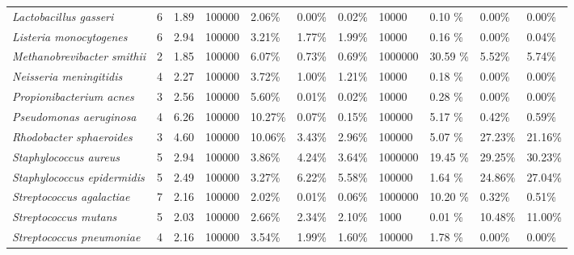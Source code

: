 \documentclass{article}
\begin{document}
\begin{landscape}
\begin{table}
\begin{tabular}{lllllllllll}
\textit{Lactobacillus gasseri} & 6 & 1.89  & 100000 & 2.06\% & 0.00\% &  0.02\% & 10000 & 0.10 \%   & 0.00\%  & 0.00\% \\
\textit{Listeria monocytogenes} & 6 & 2.94  & 100000 & 3.21\% & 1.77\% &  1.99\% & 10000 & 0.16 \%   & 0.00\%  & 0.04\% \\
\textit{Methanobrevibacter smithii} & 2 & 1.85  & 100000 & 6.07\% & 0.73\% &  0.69\% & 1000000 & 30.59 \%   & 5.52\%  & 5.74\% \\
\textit{Neisseria meningitidis} & 4 & 2.27  & 100000 & 3.72\% & 1.00\% &  1.21\% & 10000 & 0.18 \%   & 0.00\%  & 0.00\% \\
\textit{Propionibacterium acnes} & 3 & 2.56  & 100000 & 5.60\% & 0.01\% &  0.02\% & 10000 & 0.28 \%   & 0.00\%  & 0.00\% \\
\textit{Pseudomonas aeruginosa} & 4 & 6.26  & 100000 & 10.27\% & 0.07\% &  0.15\% & 100000 & 5.17 \%   & 0.42\%  & 0.59\% \\
\textit{Rhodobacter sphaeroides} & 3 & 4.60  & 100000 & 10.06\% & 3.43\% &  2.96\% & 100000 & 5.07 \%   & 27.23\%  & 21.16\% \\
\textit{Staphylococcus aureus} & 5 & 2.94  & 100000 & 3.86\% & 4.24\% &  3.64\% & 1000000 & 19.45 \%   & 29.25\%  & 30.23\% \\
\textit{Staphylococcus epidermidis} & 5 & 2.49  & 100000 & 3.27\% & 6.22\% &  5.58\% & 100000 & 1.64 \%   & 24.86\%  & 27.04\% \\
\textit{Streptococcus agalactiae} & 7 & 2.16  & 100000 & 2.02\% & 0.01\% &  0.06\% & 1000000 & 10.20 \%   & 0.32\%  & 0.51\% \\
\textit{Streptococcus mutans} & 5 & 2.03  & 100000 & 2.66\% & 2.34\% &  2.10\% & 1000 & 0.01 \%   & 10.48\%  & 11.00\% \\
\textit{Streptococcus pneumoniae} & 4 & 2.16  & 100000 & 3.54\% & 1.99\% &  1.60\% & 100000 & 1.78 \%   & 0.00\%  & 0.00\% \\
\hline
\end{tabular}
\end{table}
\end{landscape}
\end{document}
